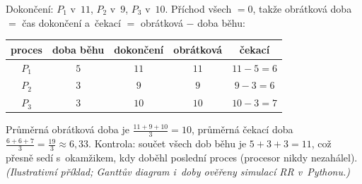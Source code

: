 \begin{priklad}
\begin{center}
%
\end{center}

Dokončení: $P_1$ v~$11$, $P_2$ v~$9$, $P_3$ v~$10$. Příchod všech $=0$, takže obrátková doba $=$ čas dokončení a~čekací $=$ obrátková $-$ doba běhu:
\begin{center}
\begin{tabular}{c|c|c|c|c}
proces & doba běhu & dokončení & obrátková & čekací\\\hline
$P_1$ & $5$ & $11$ & $11$ & $11-5=\boxed{6}$\\
$P_2$ & $3$ & $9$  & $9$  & $9-3=\boxed{6}$\\
$P_3$ & $3$ & $10$ & $10$ & $10-3=\boxed{7}$\\
\end{tabular}
\end{center}
Průměrná obrátková doba je $\tfrac{11+9+10}{3}=\boxed{10}$, průměrná čekací doba $\tfrac{6+6+7}{3}=\tfrac{19}{3}\approx\boxed{6{,}33}$. Kontrola: součet všech dob běhu je $5+3+3=11$, což přesně sedí s~okamžikem, kdy doběhl poslední proces (procesor nikdy nezahálel). \textit{(Ilustrativní příklad; Ganttův diagram i~doby ověřeny simulací RR v~Pythonu.)}
\end{priklad}
